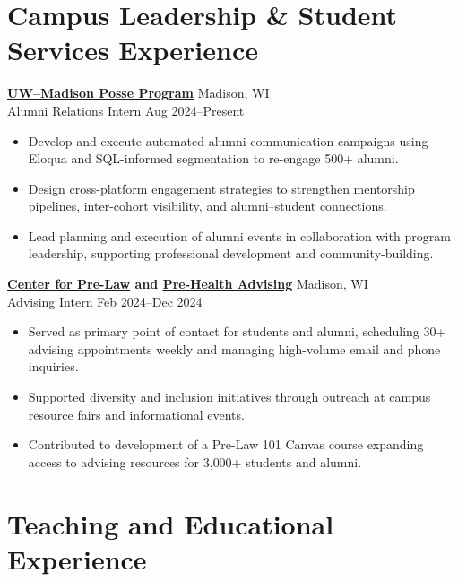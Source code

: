 \documentclass[10.5pt]{article} %
\begin{document}
\section*{Campus Leadership \& Student Services Experience}

\textbf{\href{https://posseprogram.wisc.edu/}{UW--Madison Posse Program}} \hfill Madison, WI \\
\href{https://posseprogram.wisc.edu/staff/de-la-torre-alejandro/}{Alumni Relations Intern} \hfill Aug 2024--Present
\begin{itemize}
    \item Develop and execute automated alumni communication campaigns using Eloqua and SQL-informed segmentation to re-engage 500+ alumni.
    \item Design cross-platform engagement strategies to strengthen mentorship pipelines, inter-cohort visibility, and alumni--student connections.
    \item Lead planning and execution of alumni events in collaboration with program leadership, supporting professional development and community-building.
\end{itemize}

\vspace{2pt} %
\noindent\textbf{\href{https://prelaw.wisc.edu/}{Center for Pre-Law} and \href{https://prehealth.wisc.edu/}{Pre-Health Advising}} \hfill Madison, WI \\
Advising Intern \hfill Feb 2024--Dec 2024
\begin{itemize}
    \item Served as primary point of contact for students and alumni, scheduling 30+ advising appointments weekly and managing high-volume email and phone inquiries.
    \item Supported diversity and inclusion initiatives through outreach at campus resource fairs and informational events.
    \item Contributed to development of a Pre-Law 101 Canvas course expanding access to advising resources for 3{,}000+ students and alumni.
\end{itemize}

\section*{Teaching and Educational Experience}
\end{document}
